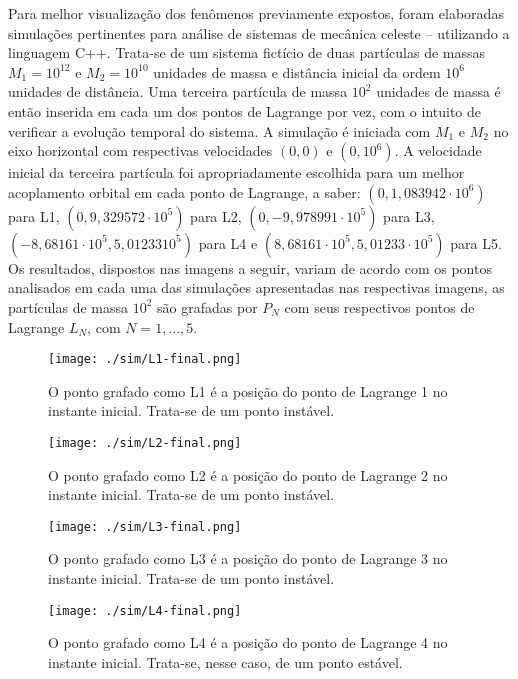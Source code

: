    Para melhor visualização dos fenômenos previamente expostos, foram elaboradas simulações pertinentes para análise de sistemas de mecânica celeste \cite{sashalag, sashaeng} -- utilizando a linguagem C++. Trata-se de um sistema fictício de duas partículas de massas $M_1 = 10^{12}$ e $M_2 = 10^{10}$ unidades de massa e distância inicial da ordem $10^6$ unidades de distância. Uma terceira partícula de massa $10^2$ unidades de massa é então inserida em cada um dos pontos de Lagrange por vez, com o intuito de verificar a evolução temporal do sistema. A simulação é iniciada com $M_1$ e $M_2$ no eixo horizontal com respectivas velocidades $(0,0)$ e $(0, 10^6)$. A velocidade inicial da terceira partícula foi apropriadamente escolhida para um melhor acoplamento orbital em cada ponto de Lagrange, a saber: $(0,1,083942 \cdot 10^6)$ para L1, $(0,9,329572 \cdot 10^5)$ para L2, $(0,-9,978991 \cdot 10^5)$ para L3, $(-8,68161\cdot 10^5, 5,01233 10^5)$ para L4 e $(8,68161\cdot 10^5, 5,01233 \cdot 10^5)$ para L5. Os resultados, dispostos nas imagens a seguir, variam de acordo com os pontos analisados em cada uma das simulações apresentadas nas respectivas imagens, as partículas de massa $10^2$ são grafadas por $P_{N}$ com seus respectivos pontos de Lagrange $L_{N}$, com $N = 1,..., 5$. 
   
\begin{figure}[!H]
\centering
\texttt{[image: ./sim/L1-final.png]}
\caption{O ponto grafado como L1 é a posição do ponto de Lagrange 1 no instante inicial. Trata-se de um ponto instável.}
\end{figure}

\begin{figure}[!H]
\centering
\texttt{[image: ./sim/L2-final.png]}
\caption{O ponto grafado como L2 é a posição do ponto de Lagrange 2 no instante inicial. Trata-se de um ponto instável.}
\end{figure}

\begin{figure}[!H]
\centering
\texttt{[image: ./sim/L3-final.png]}
\caption{O ponto grafado como L3 é a posição do ponto de Lagrange 3 no instante inicial. Trata-se de um ponto instável.}
\end{figure}

\begin{figure}[!H]
\centering
\texttt{[image: ./sim/L4-final.png]}
\caption{O ponto grafado como L4 é a posição do ponto de Lagrange 4 no instante inicial. Trata-se, nesse caso, de um ponto estável.}
\end{figure}

